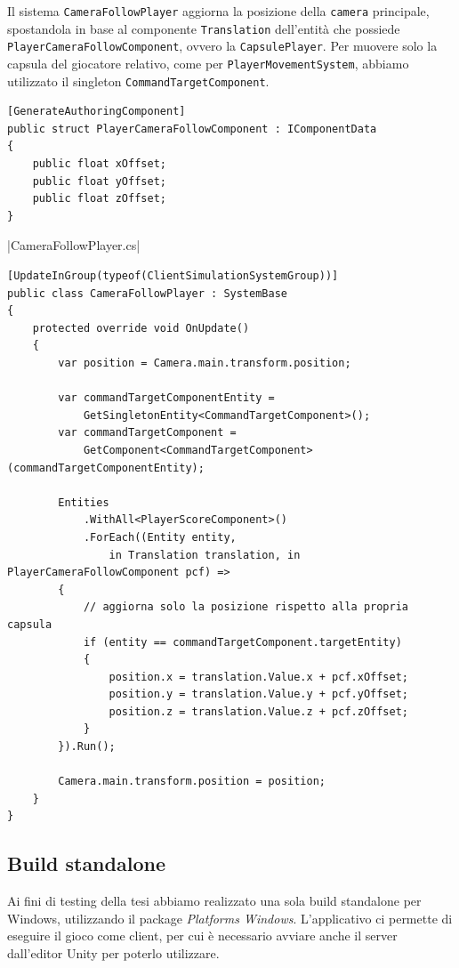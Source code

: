 Il sistema \verb|CameraFollowPlayer| aggiorna la posizione della \verb|camera| principale, spostandola in base al componente \verb|Translation| dell'entità che possiede \verb|PlayerCameraFollowComponent|, ovvero la \verb|CapsulePlayer|. Per muovere solo la capsula del giocatore relativo, come per \verb|PlayerMovementSystem|, abbiamo utilizzato il singleton \verb|CommandTargetComponent|.

\begin{lstlisting}[caption={Componente che permette alla camera di seguire la capsula.}, label={lst:prototipo-camera-follow-component}, language={[Sharp]C}]
[GenerateAuthoringComponent]
public struct PlayerCameraFollowComponent : IComponentData
{
    public float xOffset;
    public float yOffset;
    public float zOffset;
}
\end{lstlisting}

|CameraFollowPlayer.cs|

\begin{lstlisting}[caption={File \UseVerb{CameraFollowPlayerTerm}: aggiornamento della posizione della camera per seguire la capsula del client.}, label={lst:prototipo-camera-follow-system}, language={[Sharp]C}]
[UpdateInGroup(typeof(ClientSimulationSystemGroup))]
public class CameraFollowPlayer : SystemBase
{
    protected override void OnUpdate()
    {
        var position = Camera.main.transform.position;

        var commandTargetComponentEntity =
            GetSingletonEntity<CommandTargetComponent>();
        var commandTargetComponent =
            GetComponent<CommandTargetComponent>(commandTargetComponentEntity);

        Entities
            .WithAll<PlayerScoreComponent>()
            .ForEach((Entity entity,
                in Translation translation, in PlayerCameraFollowComponent pcf) =>
        {
            // aggiorna solo la posizione rispetto alla propria capsula
            if (entity == commandTargetComponent.targetEntity)
            {
                position.x = translation.Value.x + pcf.xOffset;
                position.y = translation.Value.y + pcf.yOffset;
                position.z = translation.Value.z + pcf.zOffset;
            }
        }).Run();

        Camera.main.transform.position = position;
    }
}
\end{lstlisting}

\subsection{Build standalone}
Ai fini di testing della tesi abbiamo realizzato una sola build standalone per Windows, utilizzando il package \emph{Platforms Windows}. L'applicativo ci permette di eseguire il gioco come client, per cui è necessario avviare anche il server dall'editor Unity per poterlo utilizzare.

